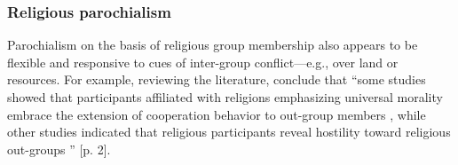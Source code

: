 \documentclass[bibauthoryear]{aa}
\begin{document}

\subsubsection{Religious parochialism}\label{relig}


Parochialism on the basis of religious group membership also appears to be flexible and responsive to cues of inter-group conflict---e.g., over land or resources. For example, reviewing the literature, \citet{lang2019moralizing} conclude that ``some studies showed that participants affiliated with religions emphasizing universal morality embrace the extension of cooperation behavior to out-group members \citep{preston2013different, ginges2016thinking, clingingsmith2009estimating, mccullough2016christian}, while other studies indicated that religious participants reveal hostility toward religious out-groups \citep{bushman2007god, shaver2018boundaries}'' [p. 2]. 
\end{document}

